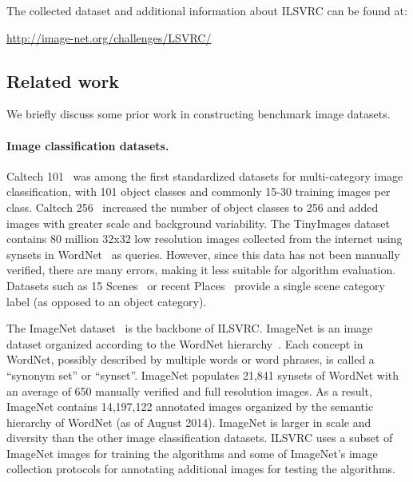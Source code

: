 The collected dataset and additional information about ILSVRC can be found at:
{\begin{center}
\url{http://image-net.org/challenges/LSVRC/}
\end{center}
}

\subsection{Related work}
\label{sec:rel}

We briefly discuss some prior work in constructing benchmark image datasets.

\paragraph{Image classification datasets.} Caltech 101~\citep{Caltech101} was among the first 
standardized datasets for multi-category image classification, with 101 object classes and commonly 15-30 training images per class. Caltech 256~\citep{Caltech256} increased the number of object classes to 256 and added images with greater scale and background variability.  The TinyImages dataset~\citep{TinyImages} contains 80 million 32x32 low resolution images collected from the internet using synsets in WordNet~\citep{WordNet} as queries. However, since this data has not been manually verified, there are many errors, making it less suitable for algorithm evaluation. Datasets such as 15 Scenes~\citep{Oliva01,BoW, Lazebnik06} or recent Places~\citep{Zhou14} provide a single scene category label (as opposed to an object category).

The ImageNet dataset~\citep{ImageNet} is the backbone of ILSVRC. 
ImageNet is an image dataset organized according to the WordNet hierarchy~\citep{WordNet}. Each  concept in WordNet, possibly described by multiple words or word phrases, is called a ``synonym set'' or ``synset''. ImageNet populates 21,841 synsets of WordNet with an average of 650 manually verified and full resolution images. As a result, ImageNet contains 14,197,122 annotated images organized by the semantic hierarchy of WordNet (as of August 2014). ImageNet is larger in scale and diversity than the other image classification datasets. ILSVRC uses a subset of ImageNet images for training the algorithms and some of ImageNet's image collection protocols for annotating additional images for testing the algorithms.



